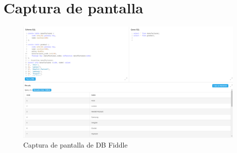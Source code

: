 \documentclass{article}
\begin{document}
\newpage %

\section*{Captura de pantalla}

\begin{figure}[h!]
    \centering
    \includegraphics[width=\linewidth]{screenshot.png} %
    \caption{Captura de pantalla de DB Fiddle}
\end{figure}
\end{document}
